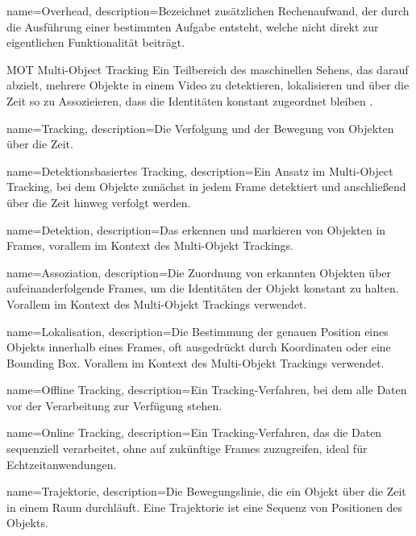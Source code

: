 {
        name=Overhead,
        description={Bezeichnet zusätzlichen Rechenaufwand, der durch die Ausführung einer bestimmten Aufgabe entsteht, welche nicht direkt zur eigentlichen Funktionalität beiträgt.}
}



\newglossaryentrywithacronym
{MOT}
{Multi-Object Tracking}
{Ein Teilbereich des maschinellen Sehens, das darauf abzielt, mehrere Objekte in einem Video zu detektieren, lokalisieren und über die Zeit so zu Assozieieren, dass die Identitäten konstant zugeordnet bleiben \cite{HOTA}.}

{
name=Tracking,
description={Die Verfolgung und der Bewegung von Objekten über die Zeit.}
}

{
name=Detektionsbasiertes Tracking,
description={Ein Ansatz im Multi-Object Tracking, bei dem Objekte zunächst in jedem Frame detektiert und anschließend über die Zeit hinweg verfolgt werden.}
}

{
name=Detektion,
description={Das erkennen und markieren von Objekten in Frames, vorallem im Kontext des Multi-Objekt Trackings.}
}

{
name=Assoziation,
description={Die Zuordnung von erkannten Objekten über aufeinanderfolgende Frames, um die  Identitäten der Objekt konstant zu halten. Vorallem im Kontext des Multi-Objekt Trackings verwendet.}
}

{
name=Lokalisation,
description={Die Bestimmung der genauen Position eines Objekts innerhalb eines Frames, oft ausgedrückt durch Koordinaten oder eine Bounding Box. Vorallem im Kontext des Multi-Objekt Trackings verwendet.}
}

{
name=Offline Tracking,
description={Ein Tracking-Verfahren, bei dem alle Daten vor der Verarbeitung zur Verfügung stehen.}
}

{
name=Online Tracking,
description={Ein Tracking-Verfahren, das die Daten sequenziell verarbeitet, ohne auf zukünftige Frames zuzugreifen, ideal für Echtzeitanwendungen.}
}

{
name=Trajektorie,
description={Die Bewegungslinie, die ein Objekt über die Zeit in einem Raum durchläuft. Eine Trajektorie ist eine Sequenz von Positionen des Objekts.}
}

